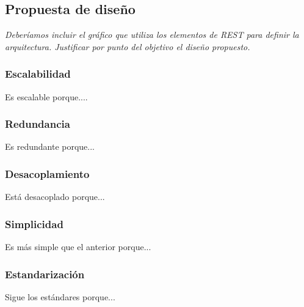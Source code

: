 \subsection{Propuesta de diseño}
\label{propuesta}


\textit{Deberíamos incluir el gráfico que utiliza los elementos de REST para definir la arquitectura. Justificar por punto del objetivo el diseño propuesto.}

\subsubsection{Escalabilidad}

Es escalable porque....


\subsubsection{Redundancia}

Es redundante porque...


\subsubsection{Desacoplamiento}

Está desacoplado porque...


\subsubsection{Simplicidad}

Es más simple que el anterior porque...


\subsubsection{Estandarización}

Sigue los estándares porque...
